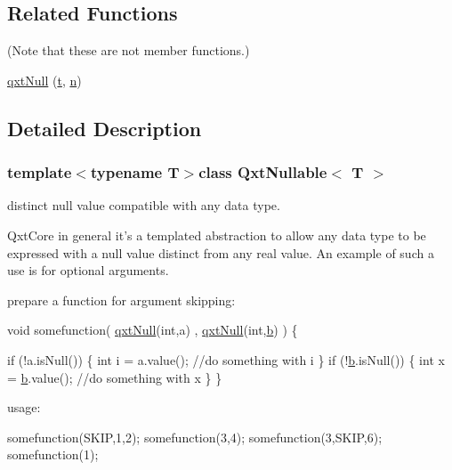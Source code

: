 \subsection*{Related Functions}
(Note that these are not member functions.) \begin{DoxyCompactItemize}
\item 
\hyperlink{class_qxt_nullable_a756f8a1a930df1dbb59f813a541d3c44}{qxt\-Null} (\hyperlink{glext_8h_a00140d6f5c548b26daf170bf16e86a6d}{t}, \hyperlink{glext_8h_a4eacae1d9e7c39f8236bb36d4ececa77}{n})
\end{DoxyCompactItemize}


\subsection{Detailed Description}
\subsubsection*{template$<$typename T$>$class Qxt\-Nullable$<$ T $>$}

distinct null value compatible with any data type. 

Qxt\-Core in general it's a templated abstraction to allow any data type to be expressed with a null value distinct from any real value. An example of such a use is for optional arguments. \par
 prepare a function for argument skipping\-:


\begin{DoxyCode}
\textcolor{keywordtype}{void}  somefunction( \hyperlink{class_qxt_nullable_a756f8a1a930df1dbb59f813a541d3c44}{qxtNull}(\textcolor{keywordtype}{int},a) , \hyperlink{class_qxt_nullable_a756f8a1a930df1dbb59f813a541d3c44}{qxtNull}(\textcolor{keywordtype}{int},\hyperlink{glext_8h_a6eba317e3cf44d6d26c04a5a8f197dcb}{b}) )
\{

\textcolor{keywordflow}{if} (!a.isNull())
 \{
 \textcolor{keywordtype}{int} i = a.value();
 \textcolor{comment}{//do something with i}
 \}
 \textcolor{keywordflow}{if} (!\hyperlink{glext_8h_a6eba317e3cf44d6d26c04a5a8f197dcb}{b}.isNull())
 \{
 \textcolor{keywordtype}{int} x = \hyperlink{glext_8h_a6eba317e3cf44d6d26c04a5a8f197dcb}{b}.value();
 \textcolor{comment}{//do something with x}
 \}
\}
\end{DoxyCode}


usage\-: 
\begin{DoxyCode}
somefunction(SKIP,1,2);
somefunction(3,4);
somefunction(3,SKIP,6);
somefunction(1);
\end{DoxyCode}
 

